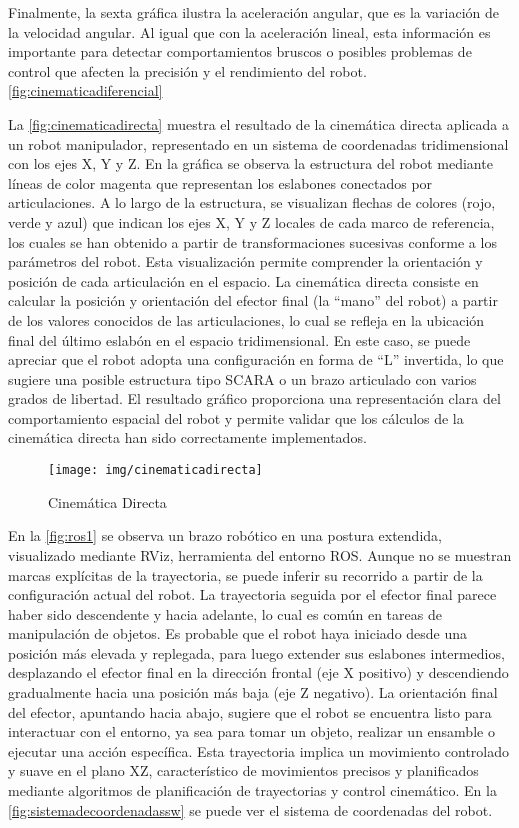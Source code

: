 Finalmente, la sexta gráfica ilustra la aceleración angular, que es la variación de la velocidad angular. Al igual que con la aceleración lineal, esta información es importante para detectar comportamientos bruscos o posibles problemas de control que afecten la precisión y el rendimiento del robot. \autoref{fig:cinematicadiferencial}

La \autoref{fig:cinematicadirecta}  muestra el resultado de la cinemática directa aplicada a un robot manipulador, representado en un sistema de coordenadas tridimensional con los ejes X, Y y Z. En la gráfica se observa la estructura del robot mediante líneas de color magenta que representan los eslabones conectados por articulaciones. A lo largo de la estructura, se visualizan flechas de colores (rojo, verde y azul) que indican los ejes X, Y y Z locales de cada marco de referencia, los cuales se han obtenido a partir de transformaciones sucesivas conforme a los parámetros del robot. Esta visualización permite comprender la orientación y posición de cada articulación en el espacio. La cinemática directa consiste en calcular la posición y orientación del efector final (la “mano” del robot) a partir de los valores conocidos de las articulaciones, lo cual se refleja en la ubicación final del último eslabón en el espacio tridimensional. En este caso, se puede apreciar que el robot adopta una configuración en forma de “L” invertida, lo que sugiere una posible estructura tipo SCARA o un brazo articulado con varios grados de libertad. El resultado gráfico proporciona una representación clara del comportamiento espacial del robot y permite validar que los cálculos de la cinemática directa han sido correctamente implementados.

\begin{figure}
	\centering
	\texttt{[image: img/cinematicadirecta]}
	\caption{Cinemática Directa}
	\label{fig:cinematicadirecta}
\end{figure}

En la \autoref{fig:ros1}  se observa un brazo robótico en una postura extendida, visualizado mediante RViz, herramienta del entorno ROS. Aunque no se muestran marcas explícitas de la trayectoria, se puede inferir su recorrido a partir de la configuración actual del robot. La trayectoria seguida por el efector final parece haber sido descendente y hacia adelante, lo cual es común en tareas de manipulación de objetos. Es probable que el robot haya iniciado desde una posición más elevada y replegada, para luego extender sus eslabones intermedios, desplazando el efector final en la dirección frontal (eje X positivo) y descendiendo gradualmente hacia una posición más baja (eje Z negativo). La orientación final del efector, apuntando hacia abajo, sugiere que el robot se encuentra listo para interactuar con el entorno, ya sea para tomar un objeto, realizar un ensamble o ejecutar una acción específica. Esta trayectoria implica un movimiento controlado y suave en el plano XZ, característico de movimientos precisos y planificados mediante algoritmos de planificación de trayectorias y control cinemático. En la \autoref{fig:sistemadecoordenadassw} se puede ver el sistema de coordenadas del robot.


